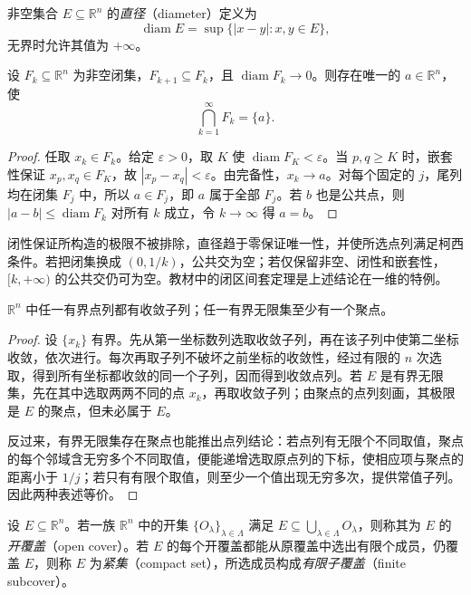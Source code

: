 \documentclass[UTF8,12pt,a4paper,fontset=fandol]{ctexbook}
\begin{document}
\begin{definition}
\label{def:euclidean-set-diameter}
非空集合 $E\subseteq\mathbb R^n$ 的\emph{直径}（diameter）定义为
\[
    \operatorname{diam}E=\sup\{|x-y|:x,y\in E\},
\]
无界时允许其值为 $+\infty$。
\end{definition}

\begin{theorem}[闭集套定理]
\label{thm:euclidean-nested-closed-sets}
设 $F_k\subseteq\mathbb R^n$ 为非空闭集，$F_{k+1}\subseteq F_k$，且 $\operatorname{diam}F_k\to0$。则存在唯一的 $a\in\mathbb R^n$，使
\[
    \bigcap_{k=1}^\infty F_k=\{a\}.
\]
\end{theorem}

\begin{proof}
任取 $x_k\in F_k$。给定 $\varepsilon>0$，取 $K$ 使 $\operatorname{diam}F_K<\varepsilon$。当 $p,q\geq K$ 时，嵌套性保证 $x_p,x_q\in F_K$，故 $|x_p-x_q|<\varepsilon$。由完备性，$x_k\to a$。对每个固定的 $j$，尾列均在闭集 $F_j$ 中，所以 $a\in F_j$，即 $a$ 属于全部 $F_j$。若 $b$ 也是公共点，则 $|a-b|\leq\operatorname{diam}F_k$ 对所有 $k$ 成立，令 $k\to\infty$ 得 $a=b$。
\end{proof}

闭性保证所构造的极限不被排除，直径趋于零保证唯一性，并使所选点列满足柯西条件。若把闭集换成 $(0,1/k)$，公共交为空；若仅保留非空、闭性和嵌套性，$[k,+\infty)$ 的公共交仍可为空。教材中的闭区间套定理是上述结论在一维的特例。

\begin{theorem}
\label{thm:euclidean-bolzano-weierstrass}
$\mathbb R^n$ 中任一有界点列都有收敛子列；任一有界无限集至少有一个聚点。
\end{theorem}

\begin{proof}
设 $\{x_k\}$ 有界。先从第一坐标数列选取收敛子列，再在该子列中使第二坐标收敛，依次进行。每次再取子列不破坏之前坐标的收敛性，经过有限的 $n$ 次选取，得到所有坐标都收敛的同一个子列，因而得到收敛点列。若 $E$ 是有界无限集，先在其中选取两两不同的点 $x_k$，再取收敛子列；由聚点的点列刻画，其极限是 $E$ 的聚点，但未必属于 $E$。

反过来，有界无限集存在聚点也能推出点列结论：若点列有无限个不同取值，聚点的每个邻域含无穷多个不同取值，便能递增选取原点列的下标，使相应项与聚点的距离小于 $1/j$；若只有有限个取值，则至少一个值出现无穷多次，提供常值子列。因此两种表述等价。
\end{proof}

\begin{definition}
\label{def:euclidean-compact-set}
设 $E\subseteq\mathbb R^n$。若一族 $\mathbb R^n$ 中的开集 $\{O_\lambda\}_{\lambda\in\Lambda}$ 满足 $E\subseteq\bigcup_{\lambda\in\Lambda}O_\lambda$，则称其为 $E$ 的\emph{开覆盖}（open cover）。若 $E$ 的每个开覆盖都能从原覆盖中选出有限个成员，仍覆盖 $E$，则称 $E$ 为\emph{紧集}（compact set），所选成员构成\emph{有限子覆盖}（finite subcover）。
\end{definition}
\end{document}
